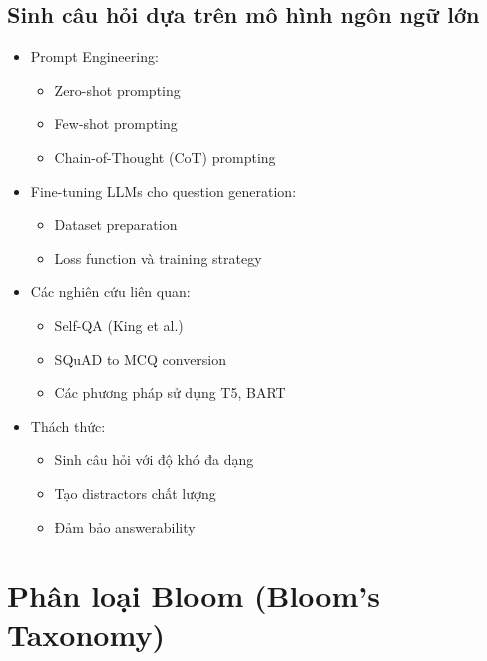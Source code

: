 \subsection{Sinh câu hỏi dựa trên mô hình ngôn ngữ lớn}
\begin{itemize}
    \item Prompt Engineering:
    \begin{itemize}
        \item Zero-shot prompting
        \item Few-shot prompting
        \item Chain-of-Thought (CoT) prompting
    \end{itemize}
    \item Fine-tuning LLMs cho question generation:
    \begin{itemize}
        \item Dataset preparation
        \item Loss function và training strategy
    \end{itemize}
    \item Các nghiên cứu liên quan:
    \begin{itemize}
        \item Self-QA (King et al.)
        \item SQuAD to MCQ conversion
        \item Các phương pháp sử dụng T5, BART
    \end{itemize}
    \item Thách thức:
    \begin{itemize}
        \item Sinh câu hỏi với độ khó đa dạng
        \item Tạo distractors chất lượng
        \item Đảm bảo answerability
    \end{itemize}
\end{itemize}

\section{Phân loại Bloom (Bloom's Taxonomy)}

